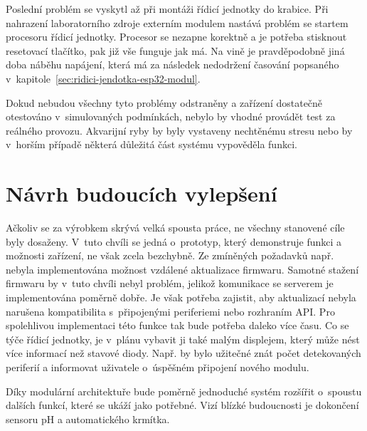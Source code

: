     Poslední problém se vyskytl až při montáži řídicí jednotky do krabice. Při nahrazení laboratorního zdroje externím modulem nastává problém se startem procesoru řídicí jednotky. Procesor se nezapne korektně a je potřeba stisknout resetovací tlačítko, pak již vše funguje jak má. Na vině je pravděpodobně jiná doba náběhu napájení, která má za následek nedodržení časování popsaného v~kapitole~\ref{sec:ridici-jendotka-esp32-modul}. 

    Dokud nebudou všechny tyto problémy odstraněny a zařízení dostatečně otestováno v~simulovaných podmínkách, nebylo by vhodné provádět test za reálného provozu. Akvarijní ryby by byly vystaveny nechtěnému stresu nebo by v~horším případě některá důležitá část systému vypověděla funkci. 

\section{Návrh budoucích vylepšení}
    Ačkoliv se za výrobkem skrývá velká spousta práce, ne všechny stanovené cíle byly dosaženy. V~tuto chvíli se jedná o~prototyp, který demonstruje funkci a možnosti zařízení, ne však zcela bezchybně. Ze zmíněných požadavků např. nebyla implementována možnost vzdálené aktualizace firmwaru. Samotné stažení firmwaru by v~tuto chvíli nebyl problém, jelikož komunikace se serverem je  implementována poměrně dobře. Je však potřeba zajistit, aby aktualizací nebyla narušena kompatibilita s~připojenými periferiemi nebo rozhraním API. Pro spolehlivou implementaci této funkce tak bude potřeba daleko více času. Co se týče řídicí jednotky, je v~plánu vybavit ji také malým displejem, který může nést více informací než stavové diody. Např. by bylo užitečné znát počet detekovaných periferií a informovat uživatele o~úspěšném připojení nového modulu. 

    Díky modulární architektuře bude poměrně jednoduché systém rozšířit o~spoustu dalších funkcí, které se ukáží jako potřebné. Vizí blízké budoucnosti je dokončení sensoru pH a automatického krmítka.